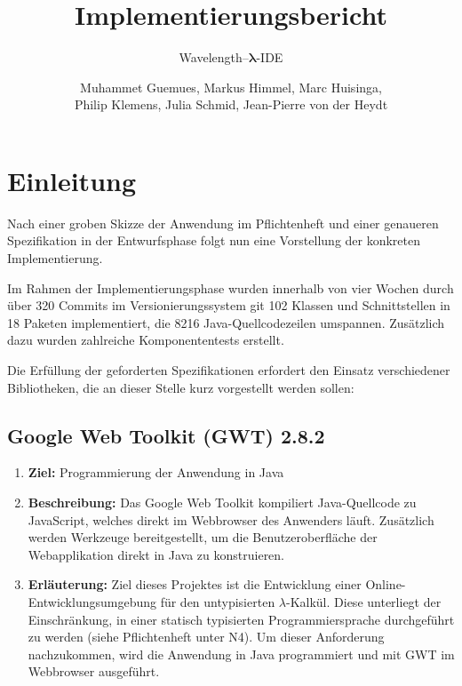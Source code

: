 \documentclass[parskip=full,11pt]{scrartcl}
\title{Implementierungsbericht}
\subtitle{Wavelength--$\bm{\lambda}$-IDE}
\author{Muhammet Guemues, Markus Himmel, Marc Huisinga,\\Philip Klemens, Julia Schmid, Jean-Pierre von der Heydt}
\begin{document}
\maketitle
\newpage
\tableofcontents
\newpage

\section{Einleitung}
Nach einer groben Skizze der Anwendung im Pflichtenheft und einer genaueren Spezifikation in der Entwurfsphase folgt nun eine Vorstellung der konkreten Implementierung.

Im Rahmen der Implementierungsphase wurden innerhalb von vier Wochen durch über 320 Commits im Versionierungssystem git
102 Klassen und Schnittstellen in 18 Paketen implementiert, die 8216 Java-Quellcodezeilen umspannen. Zusätzlich dazu wurden zahlreiche Komponententests erstellt.

Die Erfüllung der geforderten Spezifikationen erfordert den Einsatz verschiedener Bibliotheken, die an dieser Stelle kurz vorgestellt werden sollen:

\subsection{Google Web Toolkit (GWT) 2.8.2 }
\begin{enumerate}
\item[] \textbf{Ziel:} Programmierung der Anwendung in Java
\item[] \textbf{Beschreibung:} Das Google Web Toolkit kompiliert Java-Quellcode zu JavaScript, welches direkt im Webbrowser des Anwenders läuft. Zusätzlich
werden Werkzeuge bereitgestellt, um die Benutzeroberfläche der Webapplikation direkt in Java zu konstruieren.
\item[] \textbf{Erläuterung:} Ziel dieses Projektes ist die Entwicklung einer Online-Ent\-wick\-lungs\-um\-ge\-bung für den untypisierten $\lambda$-Kalkül.
Diese unterliegt der Einschränkung, in einer statisch typisierten Programmiersprache durchgeführt zu werden (siehe Pflichtenheft unter N4).
Um dieser Anforderung nachzukommen, wird die Anwendung in Java programmiert und mit GWT im Webbrowser ausgeführt.
\end{enumerate}
\end{document}
